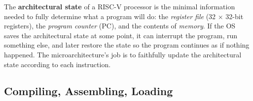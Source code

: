 \documentclass[9pt, a4paper]{extarticle}
\begin{document}
The \textbf{architectural state} of a RISC-V processor is the minimal information needed to fully determine what a program will do: the \emph{register file} (32 $\times$ 32-bit registers), the \emph{program counter} (PC), and the contents of \emph{memory}. If the OS saves the architectural state at some point, it can interrupt the program, run something else, and later restore the state so the program continues as if nothing happened. The microarchitecture's job is to faithfully update the architectural state according to each instruction.

\subsection{Compiling, Assembling, Loading}

\end{document}
